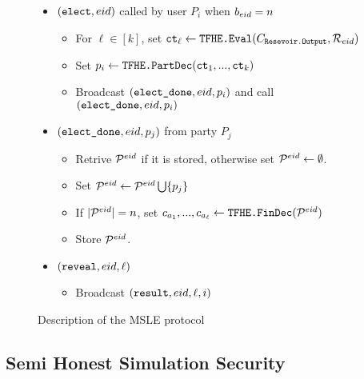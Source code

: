 \begin{figure}
{\begin{minipage}{1\textwidth}
\begin{itemize}
				\item $(\texttt{elect}, {eid})$ called by user $P_i$ when  $b_{eid} = n$
				      \begin{itemize}
					      \item For $\ell \in [k]$, set $\texttt{ct}_{\ell} \gets \texttt{TFHE.Eval}(C_{\texttt{Resevoir.Output}}, \mathcal{R}_{eid})$
					      \item Set $p_i \gets \texttt{TFHE.PartDec}(\texttt{ct}_1, ..., \texttt{ct}_k)$
					      \item Broadcast $(\texttt{elect\_done}, {eid}, p_i)$ and call $(\texttt{elect\_done}, {eid}, p_i)$
				      \end{itemize}
				\item $(\texttt{elect\_done}, {eid}, p_j)$ from party $P_j$
				      \begin{itemize}
					      \item Retrive $\mathcal{P}^{eid}$ if it is stored, otherwise set $\mathcal{P}^{eid} \gets \emptyset$.
					      \item Set $\mathcal{P}^{eid} \gets \mathcal{P}^{eid} \bigcup \{p_j\}$
					      \item If $|\mathcal{P}^{eid}| = n$, set $c_{a_1}, ..., c_{a_\ell} \gets \texttt{TFHE.FinDec}(\mathcal{P}^{eid})$
					      \item Store $\mathcal{P}^{eid}$.
				      \end{itemize}
				\item $(\texttt{reveal}, {eid}, \ell)$
				      \begin{itemize}
					      \item Broadcast $(\texttt{result}, {eid}, \ell, i)$
				      \end{itemize}
			\end{itemize}
		\end{minipage}
	}
	\caption{Description of the MSLE protocol}
	\label{fig:protocolMSLE}
\end{figure}


\subsection{Semi Honest Simulation Security}


